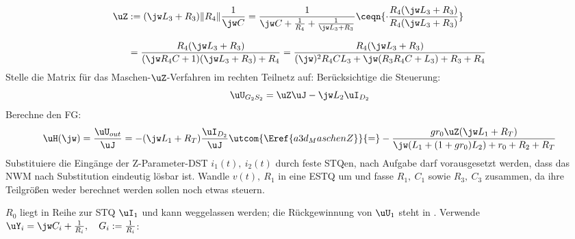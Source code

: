 \documentclass[ngerman,10pt,a4paper]{article}%
\begin{document}
\begin{align*}%
	\uZ&:=(\jw L_3+R_3)\|R_4\|\frac{1}{\jw C}=\frac{1}{%
		\jw C+\frac{1}{R_4}+\frac{1}{\jw L_3+R_3}%
	}\ceqn{%
		\cdot\frac{%
			R_4(\jw L_3+R_3)%
		}{%
			R_4(\jw L_3+R_3)%
		}%
	}\\[2.5mm]%
%
	&=\frac{%
		R_4(\jw L_3+R_3)%
	}{%
		(\jw R_4C+1)(\jw L_3+R_3)+R_4%
	}=\frac{%
		R_4(\jw L_3+R_3)%
	}{%
		(\jw)^2R_4CL_3+\jw(R_3R_4C+L_3)+R_3+R_4%
	}%
\end{align*}%
%
Stelle die Matrix für das Maschen-$\uZ$-Verfahren im rechten Teilnetz auf:
%
%
Berücksichtige die Steuerung:
\[%
	\uU_{G_2S_2}=\uZ\uJ-\jw L_2\uI_{D_2}%
\]%
%
Berechne den FG:
\[%
	\uH(\jw)=\frac{\uU_{out}}{\uJ}=-(\jw L_1+R_T)\frac{\uI_{D_2}}{\uJ}\utcom{%
		\Eref{a3d_MaschenZ}%
	}{=}-\frac{%
		gr_0\uZ(\jw L_1+R_T)%
	}{%
		\jw(L_1+(1+gr_0)L_2)+r_0+R_2+R_T%
	}%
\]%
%
%
%
Substituiere die Eingänge der Z-Parameter-DST $i_1(t),\:i_2(t)$ durch feste STQen, nach Aufgabe darf vorausgesetzt werden, dass das NWM nach Substitution eindeutig lösbar ist. Wandle $v(t),\: R_1$ in eine ESTQ um und fasse $R_1,\:C_1$ sowie $R_3,\:C_3$ zusammen, da ihre Teilgrößen weder berechnet werden sollen noch etwas steuern.

$R_0$ liegt in Reihe zur STQ $\uI_1$ und kann weggelassen werden; die Rückgewinnung von $\uU_1$ steht in . Verwende $\uY_i=\jw C_i+\frac{1}{R_i},\quad G_i:=\frac{1}{R_i}$:
%
\end{document}
